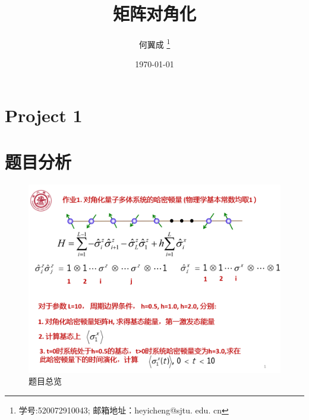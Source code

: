 \documentclass[UTF8,a4paper,10pt]{ctexart}
\title{\textbf{矩阵对角化}}
\author{ 何翼成 \thanks{学号:520072910043; \newline
    邮箱地址：heyicheng@sjtu. edu. cn} }
\date{\today}
\begin{document}
\maketitle

\section*{Project 1}
\section{题目分析}
	\begin{figure}[!htbp]
		\centering
		\includegraphics[width=1\textwidth,height=0.6\textwidth]{pictures/pro.png}
		\caption{题目总览} \label{project1}
	\end{figure}
\end{document}
